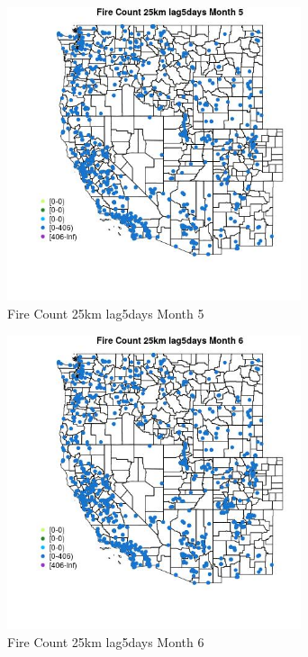 \begin{figure} 
\centering  
\includegraphics[width=0.77\textwidth]{Code_Outputs/Report_ML_input_PM25_Step4_part_f_de_duplicated_aves_prioritize_24hr_obswNAs_MapObsMo5Fire_Count_25km_lag5days.jpg} 
\caption{\label{fig:Report_ML_input_PM25_Step4_part_f_de_duplicated_aves_prioritize_24hr_obswNAsMapObsMo5Fire_Count_25km_lag5days}Fire Count 25km lag5days Month 5} 
\end{figure} 
 

\begin{figure} 
\centering  
\includegraphics[width=0.77\textwidth]{Code_Outputs/Report_ML_input_PM25_Step4_part_f_de_duplicated_aves_prioritize_24hr_obswNAs_MapObsMo6Fire_Count_25km_lag5days.jpg} 
\caption{\label{fig:Report_ML_input_PM25_Step4_part_f_de_duplicated_aves_prioritize_24hr_obswNAsMapObsMo6Fire_Count_25km_lag5days}Fire Count 25km lag5days Month 6} 
\end{figure} 
 

